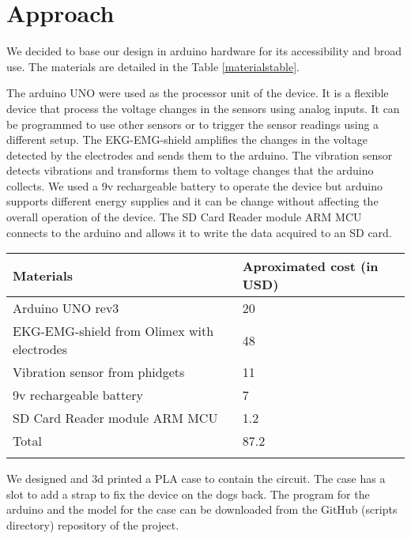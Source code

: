 \documentclass[twocolumn]{bmcart}%
\begin{document}
\section{Approach}\label{approach}

We decided to base our design in arduino hardware for its accessibility
and broad use. The materials are detailed in the Table
\ref{materialstable}.

The arduino UNO were used as the processor unit of the device. It is a
flexible device that process the voltage changes in the sensors using
analog inputs. It can be programmed to use other sensors or to trigger
the sensor readings using a different setup. The EKG-EMG-shield
amplifies the changes in the voltage detected by the electrodes and
sends them to the arduino. The vibration sensor detects vibrations and
transforms them to voltage changes that the arduino collects. We used a
9v rechargeable battery to operate the device but arduino supports
different energy supplies and it can be change without affecting the
overall operation of the device. The SD Card Reader module ARM MCU
connects to the arduino and allows it to write the data acquired to an
SD card.

\begin{table*}[t!]
\caption{\label{materialstable} Materials and cost. The table shows most of the materials used and their approximated cost with a local provider. Other materials were used but their cost is negligible.}
\begin{tabular}{l l}
 \hline\noalign{\smallskip}
   Materials  & Aproximated cost (in USD) \\
    \hline\noalign{\smallskip}
  Arduino UNO rev3                  & 20    \\
  EKG-EMG-shield from Olimex with electrodes    & 48    \\
  Vibration sensor from phidgets            & 11    \\
  9v rechargeable battery               & 7 \\
  SD Card Reader module ARM MCU         & 1.2   \\
  Total                     & 87.2  \\
  \noalign{\smallskip}\hline
\end{tabular}
\end{table*}

We designed and 3d printed a PLA case to contain the circuit. The case
has a slot to add a strap to fix the device on the dogs back. The
program for the arduino and the model for the case can be downloaded
from the GitHub (scripts directory) repository of the project.
\end{document}

